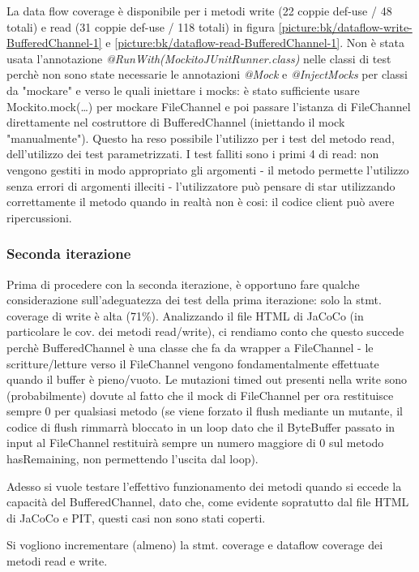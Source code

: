 \documentclass[10pt, a4paper]{article}
\newcommand{\getpicturelabel}[1]{picture:#1}
\begin{document}
	La data flow coverage è disponibile per i metodi write (22 coppie def-use / 48 totali) e 
	read (31 coppie def-use / 118 totali) in figura 
	\ref{\getpicturelabel{bk/dataflow-write-BufferedChannel-1}} e 
	\ref{\getpicturelabel{bk/dataflow-read-BufferedChannel-1}}.
	Non è stata usata l'annotazione \textit{@RunWith(MockitoJUnitRunner.class)} nelle classi di test perchè
	non sono state necessarie le annotazioni \textit{@Mock} e \textit{@InjectMocks} per classi da "mockare" e
	verso le quali iniettare i mocks: è stato sufficiente usare Mockito.mock(\dots) per mockare FileChannel e poi
	passare l'istanza di FileChannel direttamente nel costruttore di BufferedChannel 
	(iniettando il mock "manualmente"). 
	Questo ha reso possibile l'utilizzo per i test del metodo read, dell'utilizzo dei test parametrizzati.
	I test falliti sono i primi 4 di read: non vengono gestiti in modo appropriato gli argomenti - il metodo
	permette l'utilizzo senza errori di argomenti illeciti - l'utilizzatore può pensare di star utilizzando
	correttamente il metodo quando in realtà non è cosi: il codice client può avere ripercussioni.
	
	\subsubsection{Seconda iterazione}
	Prima di procedere con la seconda iterazione, è opportuno fare qualche considerazione sull'adeguatezza
	dei test della prima iterazione: solo la stmt. coverage di write è alta (71\%).
	Analizzando il file HTML di JaCoCo (in particolare le cov. dei metodi read/write), ci rendiamo conto che
	questo succede perchè BufferedChannel
	è una classe che fa da wrapper a FileChannel - le scritture/letture verso il FileChannel vengono fondamentalmente
	effettuate quando il buffer è pieno/vuoto. Le mutazioni timed out presenti nella write
	sono (probabilmente) 
	dovute al fatto che il mock di FileChannel per ora restituisce sempre 0 per qualsiasi metodo (se viene
	forzato il flush mediante un mutante, il codice di flush rimmarrà bloccato in un loop dato che 
	il ByteBuffer passato in input al FileChannel
	restituirà sempre un numero maggiore di 0 sul metodo hasRemaining, 
	non permettendo l'uscita dal loop).
	
	Adesso si vuole testare l'effettivo funzionamento dei metodi quando si eccede la capacità del BufferedChannel,
	dato che, come evidente sopratutto dal file HTML di JaCoCo e PIT, questi casi non sono stati coperti.
	
	Si vogliono incrementare (almeno) la stmt. coverage e dataflow coverage dei metodi read e write.
	
\end{document}
